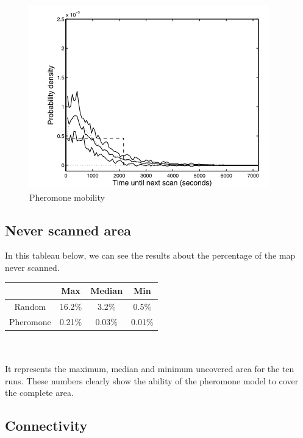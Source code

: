 \begin{figure}[!h]
\caption{\label{pheromonechar} Pheromone mobility}
   \includegraphics{../images/pheromone_scan_characteristic.png}
\end{figure}

\subsection{Never scanned area}

In this tableau below, we can see the results about the percentage of the map never scanned.\\

\begin{tabular}{|c|c|c|c|}
\hline
	      & Max & Median & Min \\
	      \hline
	Random & 16.2\% & 3.2\% & 0.5\% \\
	\hline
	Pheromone & 0.21\% & 0.03\% & 0.01\% \\
	\hline
\end{tabular}\\\\

It represents the maximum, median and minimum uncovered area for the ten runs. These numbers clearly show the ability of the pheromone model to cover the complete area. 

\newpage

\subsection{Connectivity}

